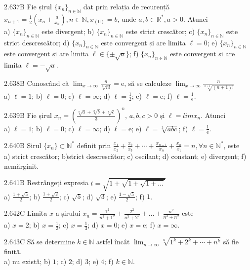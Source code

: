 \documentclass[11pt]{article}
\begin{document}
2.637B Fie șirul $\{x_{n}\}_{n \in \mathbb{N}}$ dat prin relația de recurență $x_{n+1} = \frac{1}{2} (x_{n}+\frac{a}{x_{n}}), n \in \mathbb{N}, x_(0)=b$, unde $a,b \in \mathbb{R}^{*}, a>0$. Atunci\\ a) $\{x_{n}\}_{n \in \mathbb{N}}$ este divergent; b) $\{x_{n}\}_{n \in \mathbb{N}}$ este strict crescător; c) $\{x_{n}\}_{n \in \mathbb{N}}$ este strict descrescător; d) $\{x_{n}\}_{n \in \mathbb{N}}$ este convergent și are limita $\ell=0$; e) $\{x_{n}\}_{n \in \mathbb{N}}$ este convergent și are limita $\ell \in \{\pm\sqrt{a}\}$; f) $\{x_{n}\}_{n \in \mathbb{N}}$ este convergent și are limita $\ell = -\sqrt{a}$.

2.638B Cunoscând că $\lim_{x \rightarrow \infty} \frac{n}{\sqrt[n]{n!}}=\mathrm{e}$, să se calculeze $\lim_{x \rightarrow \infty} \frac{n}{\sqrt[n+1]{(n+1)!}}$\\ a) $\ell =1$; b) $\ell =0$; c) $\ell =\infty$; d) $\ell =\frac{1}{2}$; e) $\ell =\mathrm{e}$; f) $\ell =\frac{1}{\mathrm{e}}$.

2.639B Fie șirul $x_{n}=(\frac{\sqrt[n]{a}+\sqrt[n]{b}+\sqrt[n]{c}}{3})^{n}$, $a,b,c>0$ și $\ell = lim x_{n}$. Atunci\\ a) $\ell =1$; b) $\ell =0$; c) $\ell =\infty$; d) $\ell =\mathrm{e}$; e) $\ell =\sqrt[3]{abc}$; f) $\ell =\frac{1}{\mathrm{e}}$.

2.640B Șirul $\{x_{n}\} \subset \mathbb{N}^{*}$ definit prin $\frac{x_{1}}{x_{2}}+\frac{x_{2}}{x_{3}}+\cdots+\frac{x_{n-1}}{x_{n}}+\frac{x_{n}}{x_{1}}=n, \forall n \in \mathbb{N}^{*}$, este\\ a) strict crescător; b)strict descrescător; c) oscilant; d) constant; e) divergent; f) nemărginit.

2.641B Restrângeți expresia $t=\sqrt{1+\sqrt{1+\sqrt{1+\ldots}}}$\\ a) $\frac{1+\sqrt{5}}{2}$; b) $\frac{1+\sqrt{2}}{2}$; c) $\sqrt{5}$; d) $\sqrt{3}$; e) $\frac{1-\sqrt{5}}{2}$; f) $1$.

2.642C Limita $x$ a șirului $x_{n}=\frac{1^{2}}{n^{3}+1^{2}}+\frac{2^{2}}{n^{3}+2^{2}}+\ldots+\frac{n^{2}}{n^{3}+n^{2}}$ este\\ a) $x=2$; b) $x=\frac{1}{2}$; c) $x=\frac{1}{3}$; d) $x=0$; e) $x=\mathrm{e}$; f) $x=\infty$.

2.643C Să se determine $k \in \mathbb{N}$ astfel încât $\lim _{n \rightarrow \infty} \sqrt[n]{1^{k}+2^{k}+\cdots+n^{k}}$ să fie finită.\\ a) nu există; b) $1$; c) $2$; d) $3$; e) $4$; f) $k \in \mathbb{N}$.
\end{document}
